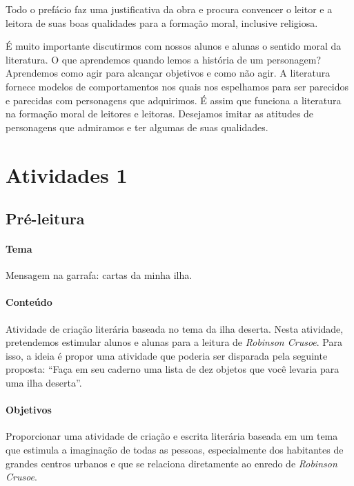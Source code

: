 \documentclass{article}
\begin{document}
Todo o prefácio faz uma justificativa da obra e procura convencer o
leitor e a leitora de suas boas qualidades para a formação moral,
inclusive religiosa.

É muito importante discutirmos com nossos alunos e alunas o sentido
moral da literatura. O que aprendemos quando lemos a história de um
personagem? Aprendemos como agir para alcançar objetivos e como não
agir. A literatura fornece modelos de comportamentos nos quais nos
espelhamos para ser parecidos e parecidas com personagens que
adquirimos. É assim que funciona a literatura na formação moral de
leitores e leitoras. Desejamos imitar as atitudes de personagens que
admiramos e ter algumas de suas qualidades.



\section{Atividades 1}


\subsection{Pré-leitura}


\paragraph{Tema} Mensagem na garrafa: cartas da minha ilha.

\paragraph{Conteúdo}
Atividade de criação literária baseada no tema da ilha deserta.
Nesta atividade, pretendemos estimular alunos e alunas para a leitura de
\emph{Robinson Crusoe}. Para isso, a ideia é propor uma atividade que
poderia ser disparada pela seguinte proposta: ``Faça em seu caderno uma
lista de dez objetos que você levaria para uma ilha deserta''.


\paragraph{Objetivos}
Proporcionar uma atividade de criação e escrita literária baseada em um
tema que estimula a imaginação de todas as pessoas, especialmente dos
habitantes de grandes centros urbanos e que se relaciona diretamente ao
enredo de \emph{Robinson Crusoe}.
\end{document}
